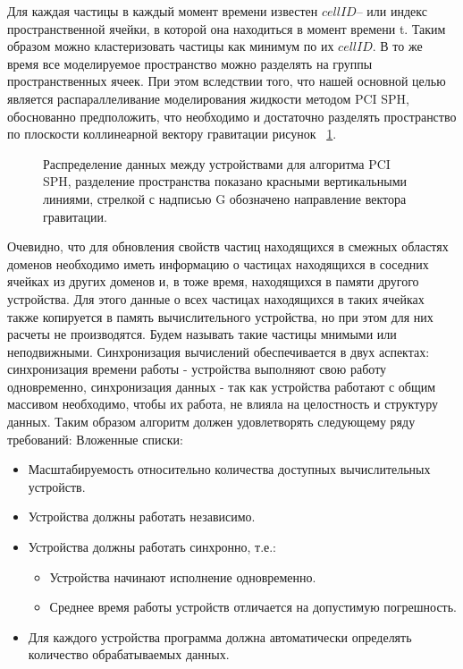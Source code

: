Для каждая частицы в каждый момент времени известен \(cellID\)– или индекс пространственной ячейки, в которой она находиться  в момент времени t. Таким образом можно кластеризовать частицы как минимум по их \(cellID\). В то же время все моделируемое пространство можно разделять на группы пространственных ячеек. При этом вследствии  того, что нашей основной целью является распараллеливание моделирования жидкости методом PCI SPH, обоснованно предположить, что необходимо и достаточно разделять пространство по плоскости коллинеарной вектору гравитации рисунок ~\ref{fig:dstr_1}.
\begin{figure}[ht]
  \caption{Распределение данных между устройствами для алгоритма PCI SPH, разделение пространства показано красными вертикальными линиями, стрелкой с надписью G обозначено направление вектора гравитации.}
  \label{fig:dstr_1}
\end{figure}

Очевидно, что для обновления свойств частиц находящихся в смежных областях доменов необходимо иметь информацию о частицах находящихся в соседних ячейках из других доменов и, в тоже время, находящихся в памяти другого устройства. Для этого данные о всех частицах находящихся в таких ячейках также копируется в память вычислительного устройства, но при этом для них расчеты не производятся. Будем называть такие частицы мнимыми или неподвижными.
Синхронизация вычислений обеспечивается в двух аспектах: синхронизация времени работы - устройства выполняют свою работу одновременно, синхронизация данных - так как устройства работают с общим массивом необходимо, чтобы их работа, не влияла на целостность и структуру данных. Таким образом алгоритм должен удовлетворять следующему ряду требований:
\noindent Вложенные списки:
\begin{itemize}
  \item Масштабируемость относительно количества доступных вычислительных устройств.
  \item Устройства должны работать независимо.
  \item Устройства должны работать синхронно, т.е.:
        \begin{itemize}
          \item Устройства начинают исполнение  одновременно.
          \item Среднее время работы устройств отличается на допустимую погрешность.
        \end{itemize}
  \item Для каждого устройства программа должна автоматически определять количество обрабатываемых данных.
\end{itemize}


